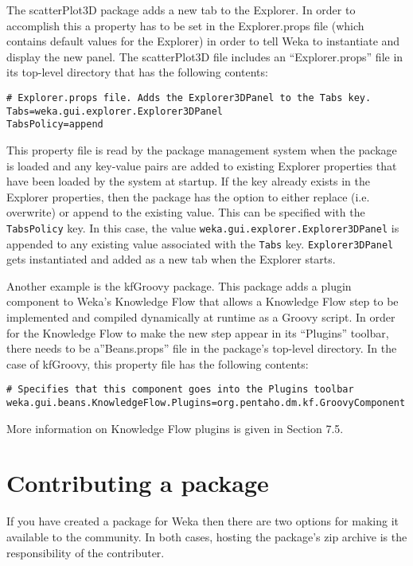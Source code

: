 The scatterPlot3D package adds a new tab to the Explorer. In order to
accomplish this a property has to be set in the Explorer.props file
(which contains default values for the Explorer) in order to tell Weka
to instantiate and display the new panel. The scatterPlot3D file includes
an ``Explorer.props'' file in its top-level directory that has the following
contents:

\begin{verbatim}
# Explorer.props file. Adds the Explorer3DPanel to the Tabs key.
Tabs=weka.gui.explorer.Explorer3DPanel
TabsPolicy=append
\end{verbatim}

This property file is read by the package management system when the
package is loaded and any key-value pairs are added to existing
Explorer properties that have been loaded by the system at startup. If
the key already exists in the Explorer properties, then the package
has the option to either replace (i.e. overwrite) or append to the
existing value. This can be specified with the \texttt{TabsPolicy}
key. In this case, the value
\texttt{weka.gui.explorer.Explorer3DPanel} is appended to any existing
value associated with the \texttt{Tabs} key. \texttt{Explorer3DPanel}
gets instantiated and added as a new tab when the Explorer starts.

Another example is the kfGroovy package. This package adds a plugin
component to Weka's Knowledge Flow that allows a Knowledge Flow step
to be implemented and compiled dynamically at runtime as a Groovy
script. In order for the Knowledge Flow to make the new step appear
in its ``Plugins'' toolbar, there needs to be a''Beans.props'' file
in the package's top-level directory. In the case of kfGroovy, this
property file has the following contents:

\begin{verbatim}
# Specifies that this component goes into the Plugins toolbar
weka.gui.beans.KnowledgeFlow.Plugins=org.pentaho.dm.kf.GroovyComponent
\end{verbatim}

More information on Knowledge Flow plugins is given in Section 7.5.

\section{Contributing a package}

If you have created a package for Weka then there are two
options for making it available to the community. In both cases,
hosting the package's zip archive is the responsibility of
the contributer.

